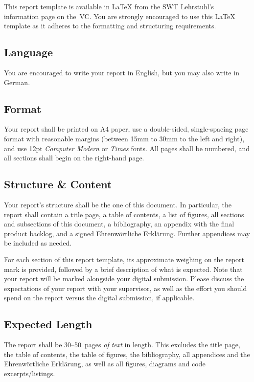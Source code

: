 \documentclass[a4paper,11pt,twoside]{article}
\begin{document}
{\em

This report template is available in \LaTeX{} from
the SWT Lehrstuhl's information page on the~VC. You are strongly
encouraged to use this \LaTeX{} template as it adheres to the
formatting and structuring requirements.	

\subsection*{Language}
You are encouraged to write your report in English, but you may
also write in German.

\subsection*{Format}
Your report shall be printed on A4 paper, use a double-sided, single-spacing page 
format with reasonable margins (between 15mm to 30mm to the left and right),
and use 12pt \emph{Computer Modern} or \emph{Times} fonts. All pages shall be numbered,
and all sections shall begin on the right-hand page.

\subsection*{Structure \& Content}
Your report's structure shall be the one of this document. In
particular, the report shall contain a title page, a table
of contents, a list of figures, all sections and subsections of this document, 
a bibliography, an appendix with the final product backlog, and a signed Ehrenwörtliche
Erklärung. Further appendices may be included as needed.

For each section of this report template, its approximate weighing on
the report mark is provided,
followed by a brief description of what is expected. Note that your
report will be marked alongside your digital submission. Please discuss
the expectations of your report with your supervisor, as well as the
effort you should spend on the report versus the digital submission, 
if applicable.

\subsection*{Expected Length}
The report shall be 30--50~pages \emph{of text} in length.  This excludes the title page, the table of contents, the table of figures, the bibliography, all appendices and the Eh\-ren\-wört\-liche Er\-klä\-rung, as well as all figures, diagrams and code excerpts/listings.

}
\end{document}
